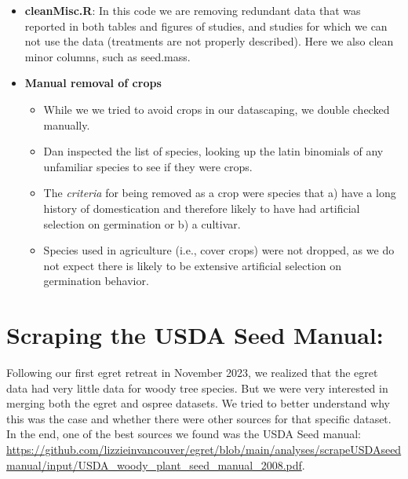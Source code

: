 \documentclass{article}[12pt]
\begin{document}
\begin{enumerate}
\begin{itemize}
\begin{itemize}
\end{itemize}
\item \textbf{cleanMisc.R}: In this code we are removing redundant data that was reported in both tables and figures of studies, and studies for which we can not use the data (treatments are not properly described). Here we also clean minor columns, such as seed.mass. 
\end{itemize}
\begin{itemize}
\item\textbf{Manual removal of crops}
\begin{itemize}
\item While we we tried to avoid crops in our datascaping, we double checked manually.
\item Dan inspected the list of species, looking up the latin binomials of any unfamiliar species to see if they were crops.
\item The \emph{criteria} for being removed as a crop were species that a) have a long history of domestication and therefore likely to have had artificial selection on germination or b) a cultivar.
\item Species used in agriculture (i.e., cover crops) were not dropped, as we do not expect there is likely to be extensive artificial selection on germination behavior.
\end{itemize}
\end{itemize}
\end{enumerate}

\section*{Scraping the USDA Seed Manual: }

Following our first egret retreat in November 2023, we realized that the egret data had very little data for woody tree species. But we were very interested in merging both the egret and ospree datasets. We tried to better understand why this was the case and whether there were other sources for that specific dataset. In the end, one of the best sources we found was the USDA Seed manual: \url{https://github.com/lizzieinvancouver/egret/blob/main/analyses/scrapeUSDAseedmanual/input/USDA_woody_plant_seed_manual_2008.pdf}.
\end{document}
